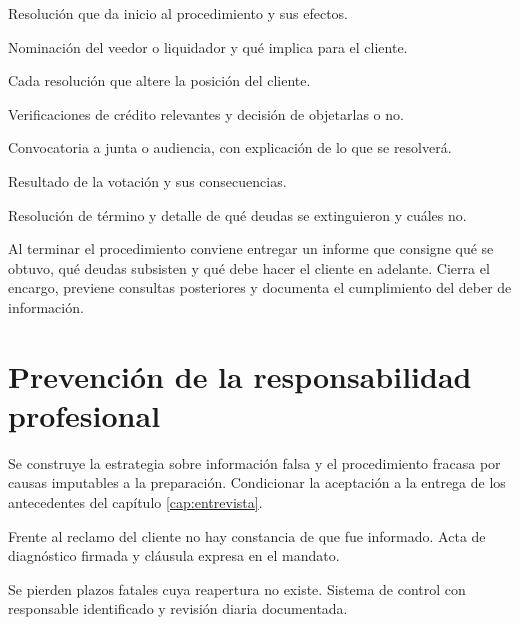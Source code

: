 \begin{checklist}
  \item Resolución que da inicio al procedimiento y sus efectos.
  \item Nominación del veedor o liquidador y qué implica para el cliente.
  \item Cada resolución que altere la posición del cliente.
  \item Verificaciones de crédito relevantes y decisión de objetarlas o no.
  \item Convocatoria a junta o audiencia, con explicación de lo que se resolverá.
  \item Resultado de la votación y sus consecuencias.
  \item Resolución de término y detalle de qué deudas se extinguieron y cuáles no.
\end{checklist}

\begin{foco}
Al terminar el procedimiento conviene entregar un informe que consigne qué se obtuvo,
qué deudas subsisten y qué debe hacer el cliente en adelante. Cierra el encargo, previene
consultas posteriores y documenta el cumplimiento del deber de información.
\end{foco}

\section{Prevención de la responsabilidad profesional}

{Se construye la estrategia sobre información falsa y el procedimiento fracasa por causas
imputables a la preparación.}
{Condicionar la aceptación a la entrega de los antecedentes del capítulo
\ref{cap:entrevista}.}

{Frente al reclamo del cliente no hay constancia de que fue informado.}
{Acta de diagnóstico firmada y cláusula expresa en el mandato.}

{Se pierden plazos fatales cuya reapertura no existe.}
{Sistema de control con responsable identificado y revisión diaria documentada.}

